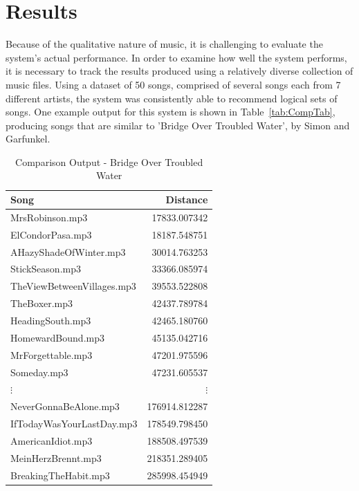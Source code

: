 \documentclass[conference]{IEEEtran}
\begin{document}
\section{Results}\label{sec:results}
Because of the qualitative nature of music, it is challenging to evaluate the system's actual performance. In order to examine how well the system performs, it is necessary to track the results produced using a relatively diverse collection of music files. Using a dataset of 50 songs, comprised of several songs each from 7 different artists, the system was consistently able to recommend logical sets of songs. One example output for this system is shown in Table~\eqref{tab:CompTab}, producing songs that are similar to 'Bridge Over Troubled Water', by Simon and Garfunkel.

\begin{table}[htbp]
    \centering
    \caption{Comparison Output - Bridge Over Troubled Water}\label{tab:CompTab}
    \begin{tabular}{lr}
      \toprule
      \textbf{Song} & \textbf{Distance} \\
      \midrule
      MrsRobinson.mp3 & 17833.007342 \\
      ElCondorPasa.mp3 & 18187.548751 \\
      AHazyShadeOfWinter.mp3 & 30014.763253 \\
      StickSeason.mp3 & 33366.085974 \\
      TheViewBetweenVillages.mp3 & 39553.522808 \\
      TheBoxer.mp3 & 42437.789784 \\
      HeadingSouth.mp3 & 42465.180760 \\
      HomewardBound.mp3 & 45135.042716 \\
      MrForgettable.mp3 & 47201.975596 \\
      Someday.mp3 & 47231.605537 \\
      \midrule
      $\vdots$ & $\vdots$ \\
      \midrule
      NeverGonnaBeAlone.mp3 & 176914.812287 \\
      IfTodayWasYourLastDay.mp3 & 178549.798450 \\
      AmericanIdiot.mp3 & 188508.497539 \\
      MeinHerzBrennt.mp3 & 218351.289405 \\
      BreakingTheHabit.mp3 & 285998.454949 \\
      \bottomrule
    \end{tabular}
  \end{table}
\end{document}

